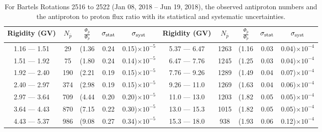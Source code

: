 \begin{table}[p] 
\renewcommand\baselinestretch{1.3}\selectfont
\setlength\tabcolsep{3pt}
\centering
\begin{tabular}{ccccc | ccccc}
\hline
\textbf{Rigidity}  (GV)  & $N_{\bar{p}}$ & $\frac{\Phi_{\bar{p}}}{\Phi_{p}}$ & $\sigma_{\rm{stat}}$ & $\sigma_{\rm{syst}}$ \hspace{1cm}   & \textbf{Rigidity}  (GV)  & $N_{\bar{p}}$ & $\frac{\Phi_{\bar{p}}}{\Phi_{p}}$ & $\sigma_{\rm{stat}}$ & $\sigma_{\rm{syst}}$ \hspace{1cm} \\ 
\hline
1.16 — 1.51   &  29                  &(1.36                          &  0.24              &      0.15)$\times 10^{-5}$  & 5.37 — 6.47                &  1263                    &(1.16                                &  0.03                   &      0.04)$\times 10^{-4}$\\
1.51 — 1.92   &  75                  &(1.80                          &  0.24              &      0.14)$\times 10^{-5}$  & 6.47 — 7.76                &  1245                    &(1.25                                &  0.03                   &      0.04)$\times 10^{-4}$\\
1.92 — 2.40   &  190                &(2.21                          &  0.19              &      0.15)$\times 10^{-5}$  & 7.76 — 9.26                &  1289                    &(1.49                                &  0.04                   &      0.07)$\times 10^{-4}$\\    
2.40 — 2.97   &  374                &(2.98                          &  0.19              &      0.15)$\times 10^{-5}$  & 9.26 — 11.0                &  1269                    &(1.63                                &  0.04                   &      0.06)$\times 10^{-4}$\\    
2.97 — 3.64   &  709                &(4.44                          &  0.20              &      0.20)$\times 10^{-5}$  & 11.0 — 13.0                 &  1203                    &(1.82                                &  0.05                   &      0.05)$\times 10^{-4}$\\
3.64 — 4.43   &  870                &(7.15                          &  0.22              &      0.30)$\times 10^{-5}$  & 13.0 — 15.3               &  1015                    &(1.82                                &  0.05                   &      0.05)$\times 10^{-4}$\\
4.43 — 5.37   &  986                &(9.08                          &  0.27              &      0.34)$\times 10^{-5}$  & 15.3 — 18.0               &  938                      &(1.93                                &  0.06                   &      0.12)$\times 10^{-4}$\\
\hline
\end{tabular}
\caption[Antiproton to proton flux ratio for Bartels Rotations 2516 to 2522]{For Bartels Rotations 2516 to 2522 (Jan 08, 2018 – Jun 19, 2018), the observed antiproton numbers and the antiproton to proton flux ratio with its statistical and systematic uncertainties.}
\label{TableOfDependent16}
\end{table}

